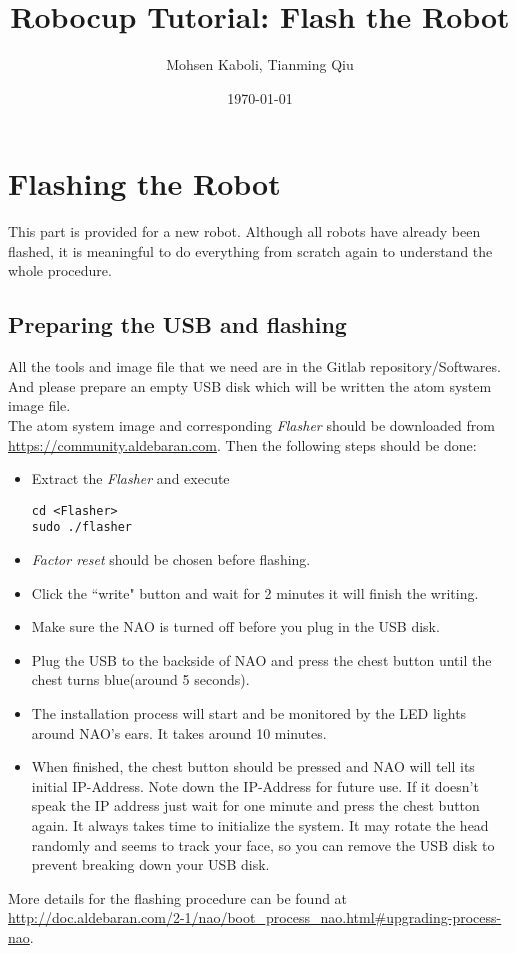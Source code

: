 \documentclass[a4paper]{article}
\title{Robocup Tutorial: Flash the Robot}
\author{Mohsen Kaboli, Tianming Qiu}
\date{\today}
\begin{document}
\maketitle



\section{Flashing the Robot}
This part is provided for a  new robot. Although all robots have already been flashed, it is meaningful to do everything from scratch again to understand the whole procedure.

\subsection{Preparing the USB and flashing}
All the tools and image file that we need are in the Gitlab repository/Softwares.\\
And please prepare an empty USB disk which will be written the atom system image file.\\ 
The atom system image and corresponding \textit{Flasher} should be downloaded from \url{https://community.aldebaran.com}. Then the following steps should be done:
\begin{itemize}
    \item Extract the \textit{Flasher} and execute
    \begin{lstlisting}
cd <Flasher>
sudo ./flasher
    \end{lstlisting}
    \item \textit{Factor reset} should be chosen before flashing.
    \item Click the ``write" button and wait for 2 minutes it will finish the writing.
    \item Make sure the NAO is turned off before you plug in the USB disk.
    \item Plug the USB to the backside of NAO and press the chest button until the chest turns blue(around 5 seconds).
    \item The installation process will start and be monitored by the LED lights around NAO's ears. It takes around 10 minutes. 
    \item When finished, the chest button should be pressed and NAO will tell its initial IP-Address. Note down the IP-Address for future  use. If it doesn't speak the IP address just wait for one minute and press the chest button again. It always takes time to initialize the system. It may rotate the head randomly and seems to track your face, so you can remove the USB disk to prevent breaking down your USB disk.
\end{itemize}
More details for the flashing procedure can be found at \url{http://doc.aldebaran.com/2-1/nao/boot_process_nao.html#upgrading-process-nao}.
\end{document}
